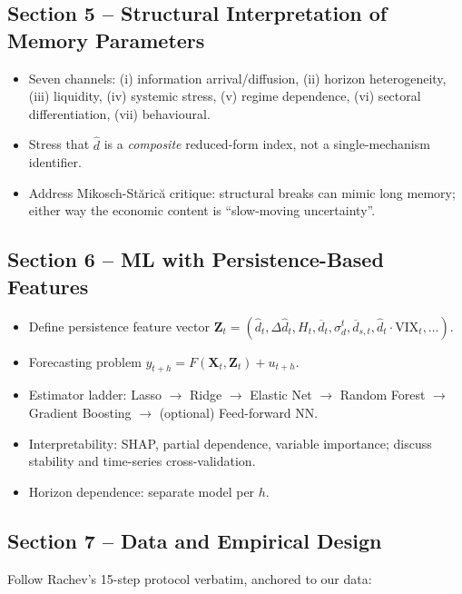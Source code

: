 \documentclass[11pt,a4paper]{article}
\begin{document}
\subsection{Section 5 -- Structural Interpretation of Memory Parameters}
\begin{itemize}
  \item Seven channels: (i) information arrival/diffusion,
  (ii) horizon heterogeneity, (iii) liquidity, (iv) systemic stress,
  (v) regime dependence, (vi) sectoral differentiation,
  (vii) behavioural.
  \item Stress that $\hat d$ is a \emph{composite} reduced-form index,
  not a single-mechanism identifier.
  \item Address Mikosch-St\u aric\u a critique: structural breaks can mimic
  long memory; either way the economic content is ``slow-moving uncertainty''.
\end{itemize}

\subsection{Section 6 -- ML with Persistence-Based Features}
\begin{itemize}
  \item Define persistence feature vector
  $\mathbf{Z}_t=(\hat d_t,\Delta\hat d_t,H_t,\overline{d}_t,\sigma_d^t,
  \overline{d}_{s,t},\hat d_t\cdot\mathrm{VIX}_t,\ldots)$.
  \item Forecasting problem $y_{t+h}=F(\mathbf{X}_t,\mathbf{Z}_t)+u_{t+h}$.
  \item Estimator ladder: Lasso $\to$ Ridge $\to$ Elastic Net $\to$ Random
  Forest $\to$ Gradient Boosting $\to$ (optional) Feed-forward NN.
  \item Interpretability: SHAP, partial dependence, variable importance;
  discuss stability and time-series cross-validation.
  \item Horizon dependence: separate model per $h$.
\end{itemize}

\subsection{Section 7 -- Data and Empirical Design}\label{sec:paper-7}
Follow Rachev's 15-step protocol verbatim, anchored to our data:
\end{document}
